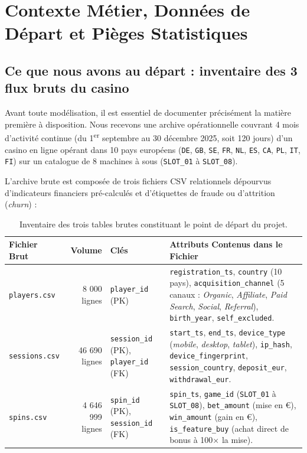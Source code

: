 \documentclass[11pt,a4paper]{article}
\begin{document}
\tableofcontents
\newpage

\section{Contexte Métier, Données de Départ et Pièges Statistiques}

\subsection{Ce que nous avons au départ : inventaire des 3 flux bruts du casino}
Avant toute modélisation, il est essentiel de documenter précisément la matière première à disposition. Nous recevons une archive opérationnelle couvrant 4 mois d'activité continue (du 1\textsuperscript{er} septembre au 30 décembre 2025, soit 120 jours) d'un casino en ligne opérant dans 10 pays européens (\texttt{DE}, \texttt{GB}, \texttt{SE}, \texttt{FR}, \texttt{NL}, \texttt{ES}, \texttt{CA}, \texttt{PL}, \texttt{IT}, \texttt{FI}) sur un catalogue de 8 machines à sous (\texttt{SLOT\_01} à \texttt{SLOT\_08}).

L'archive brute est composée de trois fichiers CSV relationnels dépourvus d'indicateurs financiers pré-calculés et d'étiquettes de fraude ou d'attrition (\textit{churn}) :

\begin{table}[h!]
\centering
\small
\begin{tabularx}{\textwidth}{l r l X}
\toprule
\textbf{Fichier Brut} & \textbf{Volume} & \textbf{Clés} & \textbf{Attributs Contenus dans le Fichier} \\
\midrule
\texttt{players.csv} & 8 000 lignes & \texttt{player\_id} (PK) & \texttt{registration\_ts}, \texttt{country} (10 pays), \texttt{acquisition\_channel} (5 canaux : \textit{Organic}, \textit{Affiliate}, \textit{Paid Search}, \textit{Social}, \textit{Referral}), \texttt{birth\_year}, \texttt{self\_excluded}. \\
\addlinespace
\texttt{sessions.csv} & 46 690 lignes & \texttt{session\_id} (PK), \texttt{player\_id} (FK) & \texttt{start\_ts}, \texttt{end\_ts}, \texttt{device\_type} (\textit{mobile}, \textit{desktop}, \textit{tablet}), \texttt{ip\_hash}, \texttt{device\_fingerprint}, \texttt{session\_country}, \texttt{deposit\_eur}, \texttt{withdrawal\_eur}. \\
\addlinespace
\texttt{spins.csv} & 4 646 999 lignes & \texttt{spin\_id} (PK), \texttt{session\_id} (FK) & \texttt{spin\_ts}, \texttt{game\_id} (\texttt{SLOT\_01} à \texttt{SLOT\_08}), \texttt{bet\_amount} (mise en \euro), \texttt{win\_amount} (gain en \euro), \texttt{is\_feature\_buy} (achat direct de bonus à 100$\times$ la mise). \\
\bottomrule
\end{tabularx}
\caption{Inventaire des trois tables brutes constituant le point de départ du projet.}
\end{table}
\end{document}
